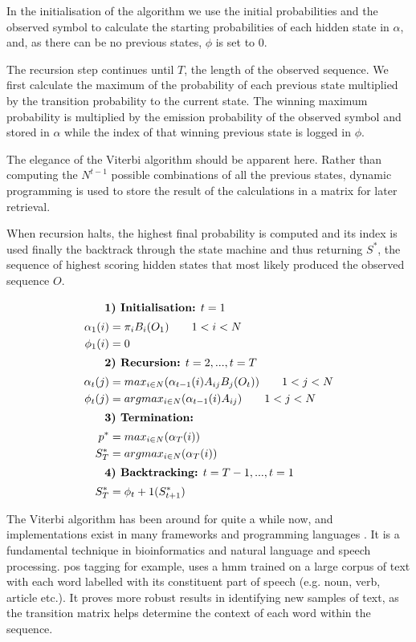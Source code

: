 {{{{{{{In the initialisation of the algorithm we use the initial probabilities and the observed symbol to calculate the starting probabilities of each hidden state in $\alpha$, and, as there can be no previous states, $\phi$ is set to 0.

The recursion step continues until $T$, the length of the observed sequence. We first calculate the maximum of the probability of each previous state multiplied by the transition probability to the current state. The winning maximum probability is multiplied by the emission probability of the observed symbol and stored in $\alpha$ while the index of that winning previous state is logged in $\phi$. 

The elegance of the Viterbi algorithm should be apparent here. Rather than computing the $N^{t-1}$ possible combinations of all the previous states, dynamic programming is used to store the result of the calculations in a matrix for later retrieval. 

When recursion halts, the highest final probability is computed and its index is used finally the backtrack through the state machine and thus returning $S^*$, the sequence of highest scoring hidden states that most likely produced the observed sequence $O$.


\setlength{\parindent}{1cm}

\indent
{
\begin{align}
\intertext{ \indent \textbf{1) Initialisation:} $t=1$}
			\alpha_1(i) &= \pi_{i}B_{i}(O_1)\qquad1<i<N \nonumber \\
			\phi_1(i) &= 0 \label{eq:markovstart} \\
\intertext{ \indent \textbf{2) Recursion:} $t=2,...,t=T$}
			\alpha_t(j) &= max_{i\in N}(\alpha_{t-1}(i)A_{ij}B_{j}(O_{t}))\qquad1<j<N \nonumber \\
			\phi_t(j) &= argmax_{i\in N}(\alpha_{t-1}(i)A_{ij})\qquad1<j<N\\
\intertext{ \indent \textbf{3) Termination:}}
			p^* &= max_{i \in N}(\alpha_T(i)) \nonumber \\
			S^*_{T} &= argmax_{i \in N}(\alpha_T(i))\\
\intertext{ \indent \textbf{4) Backtracking:} $t=T-1,...,t=1$}
			S^*_{T} &= \phi_t+1(S^*_{t+1}) \label{eq:markovend}
\end{align}
}

\normalsize

The Viterbi algorithm has been around for quite a while now, and implementations exist in many frameworks and programming languages \citep{Bird2016, Gueguen2005}. It is a fundamental technique in bioinformatics and natural language and speech processing. \acrshort{pos} tagging for example, uses a \acrshort{hmm} trained on a large corpus of text with each word labelled with its constituent part of speech (e.g. noun, verb, article etc.). It proves more robust results in identifying new samples of text, as the transition matrix helps determine the context of each word within the sequence. 

}}}}}}}

